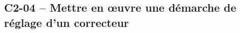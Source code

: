 \subsection{C2-04 -- Mettre en \oe{}uvre une démarche de réglage d’un correcteur}

\renewcommand{\repExo}{../../ExercicesCompetences/C2_MettreEnOeuvreDemarche/C2_04_Correcteurs}

\renewcommand{\td}{65_Eclipse}
\graphicspath{{\repStyle/png/}{\repExo/\td/images/}}


\renewcommand{\td}{65_Eclipse_02}
\graphicspath{{\repStyle/png/}{\repExo/\td/images/}}


\renewcommand{\td}{65_Eclipse_03}
\graphicspath{{\repStyle/png/}{\repExo/\td/images/}}


\renewcommand{\td}{66_Micromanipulateur}
\graphicspath{{\repStyle/png/}{\repExo/\td/images/}}


\renewcommand{\td}{67_PompeTurbo}
\graphicspath{{\repStyle/png/}{\repExo/\td/images/}}


\renewcommand{\td}{68_Roburoc}
\graphicspath{{\repStyle/png/}{\repExo/\td/images/}}


\renewcommand{\td}{70_Hublex}
\graphicspath{{\repStyle/png/}{\repExo/\td/images/}}

